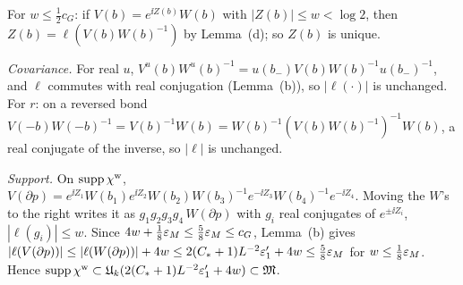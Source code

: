 \begin{detail}\label{d7:chiw}
\begin{step}
For $w\le\frac12c_G$: if $V(b)=e^{\ii Z(b)}W(b)$ with $|Z(b)|\le w<\log2$, then $Z(b)=\ell(V(b)W(b)^{-1})$ by Lemma~(d); so $Z(b)$ is unique.
\end{step}
\begin{step}
\emph{Covariance.} For real $u$, $V^u(b)W^u(b)^{-1}=u(b_-)V(b)W(b)^{-1}u(b_-)^{-1}$, and $\ell$ commutes with real conjugation (Lemma~(b)), so $|\ell(\cdot)|$ is unchanged. For $r$: on a reversed bond $V(-b)W(-b)^{-1}=V(b)^{-1}W(b)=W(b)^{-1}(V(b)W(b)^{-1})^{-1}W(b)$, a real conjugate of the inverse, so $|\ell|$ is unchanged.
\end{step}
\begin{step}
\emph{Support.} On $\operatorname{supp}\chi^{\rm w}$, $V(\partial p)=e^{\ii Z_1}W(b_1)e^{\ii Z_2}W(b_2)W(b_3)^{-1}e^{-\ii Z_3}W(b_4)^{-1}e^{-\ii Z_4}$. Moving the $W$'s to the right writes it as $g_1g_2g_3g_4\,W(\partial p)$ with $g_i$ real conjugates of $e^{\pm\ii Z_i}$, $|\ell(g_i)|\le w$. Since $4w+\frac18\varepsilon_M\le\frac58\varepsilon_M\le c_G$, Lemma~(b) gives $|\ell(V(\partial p))|\le|\ell(W(\partial p))|+4w\le2(C_*+1)L^{-2}\varepsilon'_1+4w\le\frac58\varepsilon_M$ for $w\le\frac18\varepsilon_M$. Hence $\operatorname{supp}\chi^{\rm w}\subset\mathfrak U_k(2(C_*+1)L^{-2}\varepsilon'_1+4w)\subset\mathfrak M$.
\end{step}
\end{detail}

